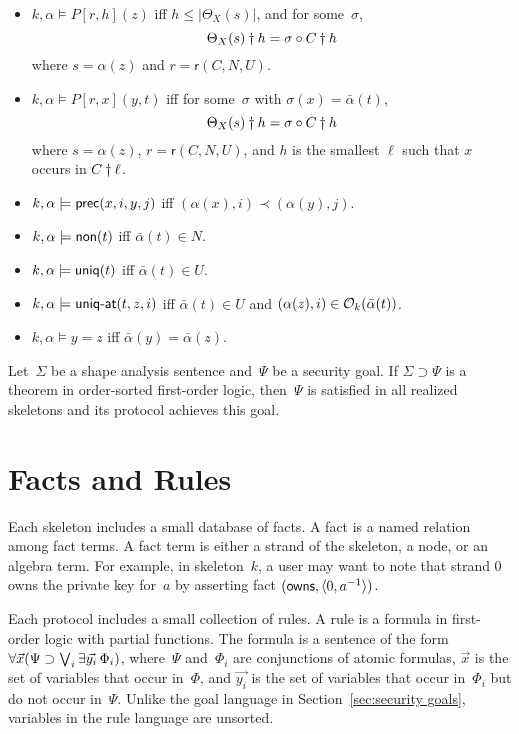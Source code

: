 \documentclass[12pt]{report}
\theoremstyle{definition}
\newcommand{\role}{\mathsf{r}}
\begin{document}
\begin{itemize}
\item $k,\alpha\models P[r,h](z)$ iff $h\leq|\Theta_X(s)|$, and for
  some~$\sigma$,
  \[\Theta_X(s)\dagger h=\sigma\circ C\dagger h\]
  where $s=\alpha(z)$ and $r=\role(C,N,U)$.

\item $k,\alpha\models P[r,x](y,t)$ iff
  for some~$\sigma$ with $\sigma(x)=\bar\alpha(t)$,
  \[\Theta_X(s)\dagger h=\sigma\circ C\dagger h\]
  where $s=\alpha(z)$, $r=\role(C,N,U)$, and $h$ is the smallest
  $\ell$ such that $x$ occurs in $C\dagger\ell$.

\item $k,\alpha\models\operatorname{\mathsf{prec}}(x,i,y,j)$ iff
  $(\alpha(x),i)\prec(\alpha(y),j)$.
\item $k,\alpha\models\operatorname{\mathsf{non}}(t)$ iff $\bar\alpha(t)\in N$.
\item $k,\alpha\models\operatorname{\mathsf{uniq}}(t)$ iff $\bar\alpha(t)\in U$.
\item $k,\alpha\models\operatorname{\mathsf{\mbox{\sf uniq-at}}}(t,z,i)$ iff $\bar\alpha(t)\in U$ and
  $(\alpha(z),i)\in\mathcal{O}_k(\bar\alpha(t))$.
\item $k,\alpha\models y=z$ iff $\bar\alpha(y)=\bar\alpha(z)$.
\end{itemize}

Let~$\Sigma$ be a shape analysis sentence and~$\Psi$ be a security
goal.  If $\Sigma\supset\Psi$ is a theorem in order-sorted first-order
logic, then~$\Psi$ is satisfied in all realized skeletons and its
protocol achieves this goal.

\chapter{Facts and Rules}\label{chp:facts and rules}

Each skeleton includes a small database of facts.  A fact is a named
relation among fact terms.  A fact term is either a
strand of the skeleton, a node, or an algebra term.  For example, in
skeleton~$k$, a user may want to note that strand 0 owns the private
key for~$a$ by asserting fact $(\operatorname{\mathsf{owns}},\langle0, a^{-1}\rangle)$.

Each protocol includes a small collection of rules.  A rule is a
formula in first-order logic with partial functions.  The formula is a
sentence of the form
$\mathop{\forall\vec{x}}(\Psi\supset\bigvee_i\mathop{\exists\vec{y_i}}\Phi_i)$,
where~$\Psi$ and~$\Phi_i$ are conjunctions of atomic formulas,
$\vec{x}$ is the set of variables that occur in~$\Phi$, and
$\vec{y_i}$ is the set of variables that occur in~$\Phi_i$ but do not
occur in~$\Psi$.  Unlike the goal language in
Section~\ref{sec:security goals}, variables in the rule language are
unsorted.
\end{document}
